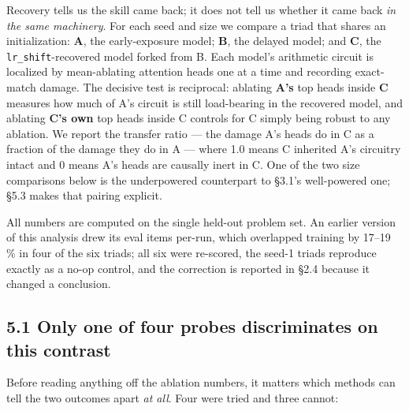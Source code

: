 \documentclass{article}
\begin{document}
Recovery tells us the skill came back; it does not tell us whether it came back \emph{in the same
machinery}. For each seed and size we compare a triad that shares an initialization: \textbf{A},
the early-exposure model; \textbf{B}, the delayed model; and \textbf{C}, the \texttt{lr\_shift}-recovered model
forked from B. Each model's arithmetic circuit is localized by mean-ablating attention heads
one at a time and recording exact-match damage. The decisive test is reciprocal: ablating
\textbf{A's} top heads inside \textbf{C} measures how much of A's circuit is still load-bearing in the
recovered model, and ablating \textbf{C's own} top heads inside C controls for C simply being
robust to any ablation. We report the transfer ratio --- the damage A's heads do in C as a
fraction of the damage they do in A --- where 1.0 means C inherited A's circuitry intact and 0
means A's heads are causally inert in C. One of the two size comparisons below is the
underpowered counterpart to §3.1's well-powered one; §5.3 makes that pairing explicit.

All numbers are computed on the single held-out problem set. An earlier version of this
analysis drew its eval items per-run, which overlapped training by 17--19 \% in four of the six
triads; all six were re-scored, the seed-1 triads reproduce exactly as a no-op control, and
the correction is reported in §2.4 because it changed a conclusion.

\subsection{5.1 Only one of four probes discriminates on this contrast}\label{only-one-of-four-probes-discriminates-on-this-contrast}

Before reading anything off the ablation numbers, it matters which methods can tell the two
outcomes apart \emph{at all}. Four were tried and three cannot:
\end{document}
